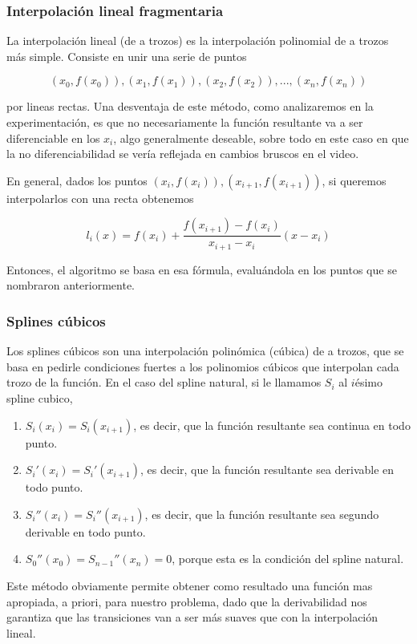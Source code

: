 \subsubsection{Interpolación lineal fragmentaria}

La interpolación lineal (de a trozos) es la interpolación polinomial de a trozos más simple. Consiste en unir una serie de puntos

\[ (x_0, f(x_0)), (x_1, f(x_1)), (x_2, f(x_2)), ..., (x_n, f(x_n)) \]

por lineas rectas. Una desventaja de este método, como analizaremos en la experimentación, es que no necesariamente la función resultante va a ser diferenciable en los $x_i$, algo generalmente deseable, sobre todo en este caso en que la no diferenciabilidad se vería reflejada en cambios bruscos en el video.

En general, dados los puntos $(x_i, f(x_i)), (x_{i+1}, f(x_{i+1}))$, si queremos interpolarlos con una recta obtenemos

\[ l_i(x) = f(x_i) + \frac{f(x_{i+1}) - f(x_i)}{x_{i+1} - x_i} (x - x_i) \]

Entonces, el algoritmo se basa en esa fórmula, evaluándola en los puntos que se nombraron anteriormente.

\subsubsection{Splines cúbicos}

Los splines cúbicos son una interpolación polinómica (cúbica) de a trozos, que se basa en pedirle condiciones fuertes a los polinomios cúbicos que interpolan cada trozo de la función. En el caso del spline natural, si le llamamos $S_i$ al $i$ésimo spline cubico,

\begin{enumerate}
    \item $S_i(x_i) = S_i(x_{i+1})$, es decir, que la función resultante sea continua en todo punto.
    \item $S_i'(x_i) = S_i'(x_{i+1})$, es decir, que la función resultante sea derivable en todo punto.
    \item $S_i''(x_i) = S_i''(x_{i+1})$, es decir, que la función resultante sea segundo derivable en todo punto.
    \item $S_0''(x_0) = S_{n-1}''(x_n) = 0$, porque esta es la condición del spline natural.
\end{enumerate}

Este método obviamente permite obtener como resultado una función mas apropiada, a priori, para nuestro problema, dado que la derivabilidad nos garantiza que las transiciones van a ser más suaves que con la interpolación lineal.

